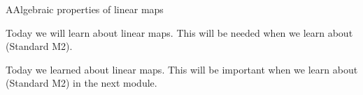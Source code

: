 \begin{module}{A}{Algebraic properties of linear maps}
\newModuleSection
\begin{goals}
Today we will learn about  linear maps. This will be needed when we learn about  (Standard M2).
\end{goals}
\begin{summary}
Today we learned about  linear maps. This will be important when we learn about  (Standard M2) in the next module.
\end{summary}


\end{module}
